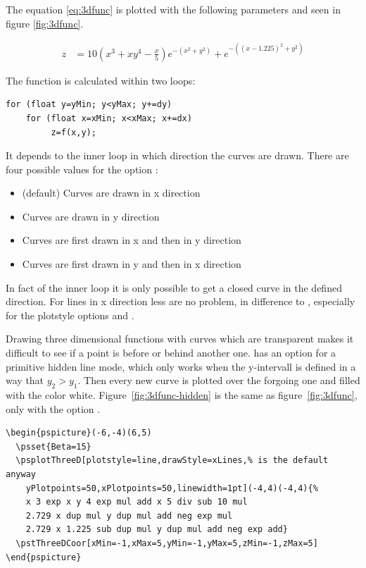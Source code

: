 \documentclass[11pt,english,bibliography=totoc,parskip=false,headings=small,
    headinclude=false,footinclude=false,twoside,english,usegeometry]{pst-doc}
\begin{document}
The equation \ref{eq:3dfunc} is plotted with the following parameters and seen in figure \ref{fig:3dfunc}.

\begin{align}\label{eq:3dfunc}
z&=10\left(x^3+xy^4-\frac{x}{5}\right)e^{-\left(x^2+y^2\right)}+
	e^{-\left((x-1.225)^2+y^2\right)}
\end{align}


The function is calculated within two loops:
{\small\begin{verbatim}
for (float y=yMin; y<yMax; y+=dy)
    for (float x=xMin; x<xMax; x+=dx)
         z=f(x,y);
\end{verbatim}}

It depends to the inner loop in which direction the curves are drawn. There are four possible
values for the option :
\begin{itemize}
\item {} (default) Curves are drawn in x direction
\item {} Curves are drawn in y direction
\item {} Curves are first drawn in x and then in y direction
\item {} Curves are first drawn in y and then in x direction
\end{itemize}

In fact of the inner loop it is only possible to get a closed curve in the defined direction. 
For lines in x direction less  are no problem, in difference to 
, especially for the plotstyle options  and .

Drawing three dimensional functions with curves which are transparent makes it difficult 
to see if a point is before or behind another one.  has an option 
 for a primitive hidden line mode, which only works when the y-intervall 
is defined in a way that $y_2>y_1$. Then every new curve is plotted over the forgoing one 
and filled with the color white. Figure~\ref{fig:3dfunc-hidden} is the same as 
figure~\ref{fig:3dfunc}, only with the option .

\begin{lstlisting}
\begin{pspicture}(-6,-4)(6,5)
  \psset{Beta=15}
  \psplotThreeD[plotstyle=line,drawStyle=xLines,% is the default anyway
    yPlotpoints=50,xPlotpoints=50,linewidth=1pt](-4,4)(-4,4){%
    x 3 exp x y 4 exp mul add x 5 div sub 10 mul
    2.729 x dup mul y dup mul add neg exp mul
    2.729 x 1.225 sub dup mul y dup mul add neg exp add}
  \pstThreeDCoor[xMin=-1,xMax=5,yMin=-1,yMax=5,zMin=-1,zMax=5]
\end{pspicture}
\end{lstlisting}
\end{document}

